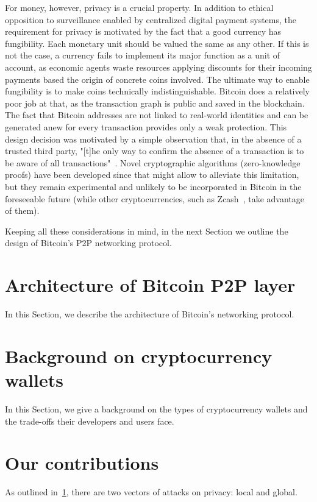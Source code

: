 For money, however, privacy is a crucial property.
In addition to ethical opposition to surveillance enabled by centralized digital payment systems, the requirement for privacy is motivated by the fact that a good currency has fungibility.
Each monetary unit should be valued the same as any other.
If this is not the case, a currency fails to implement its major function as a unit of account, as economic agents waste resources applying discounts for their incoming payments based the origin of concrete coins involved.
The ultimate way to enable fungibility is to make coins technically indistinguishable.
Bitcoin does a relatively poor job at that, as the transaction graph is public and saved in the blockchain.
The fact that Bitcoin addresses are not linked to real-world identities and can be generated anew for every transaction provides only a weak protection.
This design decision was motivated by a simple observation that, in the absence of a trusted third party, "[t]he only way to confirm the absence of a transaction is to be aware of all transactions"~\cite{Nakamoto2008}.
Novel cryptographic algorithms (zero-knowledge proofs) have been developed since that might allow to alleviate this limitation, but they remain experimental and unlikely to be incorporated in Bitcoin in the foreseeable future (while other cryptocurrencies, such as Zcash~\cite{BenSasson2014}, take advantage of them).

Keeping all these considerations in mind, in the next Section we outline the design of Bitcoin's P2P networking protocol.



\section{Architecture of Bitcoin P2P layer}
\label{sec:C02_S2_Architecture_Bitcoin_P2P}

In this Section, we describe the architecture of Bitcoin's networking protocol.

\section{Background on cryptocurrency wallets}
\label{sec:C02_S3_Background_Wallets}

In this Section, we give a background on the types of cryptocurrency wallets and the trade-offs their developers and users face.


\section{Our contributions}
\label{sec:C02_S4_Our_Contributions}

As outlined in~\ref{sec:C02_S2_Architecture_Bitcoin_P2P}, there are two vectors of attacks on privacy: local and global.

